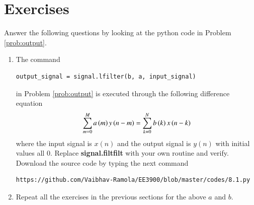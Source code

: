 \documentclass[journal,12pt,twocolumn]{IEEEtran}
\renewcommand\thesection{\arabic{section}}
\begin{document}
\section{Exercises}
Answer the following questions by looking at the python code in Problem \ref{prob:output}.
\begin{enumerate}[label=\thesection.\arabic*]
\item
The command
\begin{lstlisting}
output_signal = signal.lfilter(b, a, input_signal)
\end{lstlisting}
in Problem \ref{prob:output} is executed through the following difference equation
\begin{equation}
	\label{eq:iir_filter_gen}
	\sum _{m=0}^{M}a\left(m\right)y\left(n-m\right)=\sum _{k=0}^{N}b\left(k\right)x\left(n-k\right)
\end{equation}
%
where the input signal is $x(n)$ and the output signal is $y(n)$ with initial values all 0. Replace
\textbf{signal.filtfilt} with your own routine and verify.
\solution
Download the source code by typing the next command \\
\begin{lstlisting}
https://github.com/Vaibhav-Ramola/EE3900/blob/master/codes/8.1.py
\end{lstlisting}
%
\item Repeat all the exercises in the previous sections for the above $a$ and $b$.


\end{enumerate}
\end{document}
